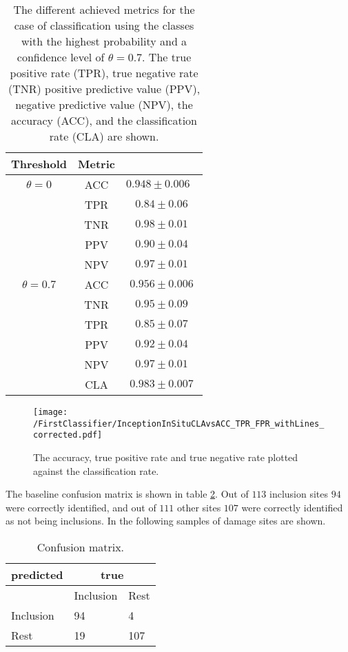 \begin{table}[H]
 \begin{center}
  \begin{tabular}{@{} *3c @{}} \toprule[2pt]
   Threshold & Metric &   \\ \midrule
   $\theta=0$ & ACC & $0.948\pm0.006 \text{ }$ \\
   &TPR  & $0.84\pm 0.06$ \\
   &TNR  & $0.98\pm 0.01$ \\
   &PPV  & $0.90\pm0.04$ \\
   &NPV  & $0.97\pm0.01$ \\ \midrule
   $\theta=0.7$& ACC & $0.956 \pm 0.006$ \\
   &TNR  & $0.95\pm 0.09$ \\
   &TPR  & $0.85\pm 0.07$ \\
   &PPV  & $0.92\pm 0.04$ \\
   &NPV  & $0.97 \pm0.01$ \\ 
   &CLA  & $0.983\pm 0.007$ \\ \bottomrule[2pt]
  \end{tabular}
 \end{center}
 \caption{{The different achieved metrics for the case of classification using the classes with the highest probability and a confidence level of $\theta =0.7$. The true positive rate (TPR), true negative rate (TNR) positive predictive value (PPV), negative predictive value (NPV), the accuracy (ACC), and the classification rate (CLA) are shown.}}
   \label{tab:FirstClassifierMetrics}
\end{table}

\begin{figure}[H]
\texttt{[image: /FirstClassifier/InceptionInSituCLAvsACC\_TPR\_FPR\_withLines\_corrected.pdf]}
\caption{The accuracy, true positive rate and true negative rate plotted against the classification rate. }
\label{fig:FirstClassifierInSitu}
\end{figure}

The baseline confusion matrix is shown in table \ref{tab:FirstClassifierConfusionMatrixInSitu}. Out of $113$ inclusion sites $94$ were correctly identified, and out of $111$ other sites $107$ were correctly identified as not being inclusions. In the following samples of damage sites are shown.

\begin{table}[H]
 \begin{center}
  \begin{tabular}{@{} *3l @{}} \toprule[2pt]
   predicted &  \multicolumn{2}{c}{true}  \\\midrule
    & Inclusion  & Rest   \\ 
   Inclusion  & 94 & 4 \\ 
   Rest  & 19 & 107 \\ \bottomrule[2pt]
  \end{tabular}
 \end{center}
 \caption{Confusion matrix.}
   \label{tab:FirstClassifierConfusionMatrixInSitu}
\end{table}

